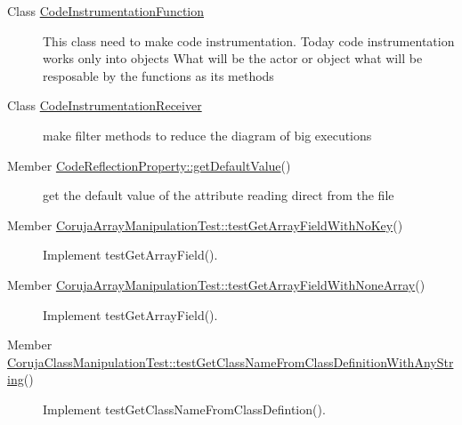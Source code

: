 \label{todo__todo000001}
\hypertarget{todo__todo000001}{}
 \begin{description}
\item[Class \hyperlink{class_code_instrumentation_function}{CodeInstrumentationFunction} ]This class need to make code instrumentation. Today code instrumentation works only into objects  What will be the actor or object what will be resposable by the functions as its methods

\end{description}


\label{todo__todo000002}
\hypertarget{todo__todo000002}{}
 \begin{description}
\item[Class \hyperlink{class_code_instrumentation_receiver}{CodeInstrumentationReceiver} ]make filter methods to reduce the diagram of big executions

\end{description}


\label{todo__todo000003}
\hypertarget{todo__todo000003}{}
 \begin{description}
\item[Member \hyperlink{class_code_reflection_property_f9b9401c63918169457fe8516324950f}{CodeReflectionProperty::getDefaultValue}() ]get the default value of the attribute reading direct from the file \end{description}


\label{todo__todo000004}
\hypertarget{todo__todo000004}{}
 \begin{description}
\item[Member \hyperlink{class_coruja_array_manipulation_test_8399ad4b91876142e2d69ba6077c04eb}{CorujaArrayManipulationTest::testGetArrayFieldWithNoKey}() ]Implement testGetArrayField(). \end{description}


\label{todo__todo000005}
\hypertarget{todo__todo000005}{}
 \begin{description}
\item[Member \hyperlink{class_coruja_array_manipulation_test_48ada181c4be1fc27b5b5542599ac884}{CorujaArrayManipulationTest::testGetArrayFieldWithNoneArray}() ]Implement testGetArrayField(). \end{description}


\label{todo__todo000007}
\hypertarget{todo__todo000007}{}
 \begin{description}
\item[Member \hyperlink{class_coruja_class_manipulation_test_796ba61d6460c6e55138f1a683f17899}{CorujaClassManipulationTest::testGetClassNameFromClassDefinitionWithAnyString}() ]Implement testGetClassNameFromClassDefintion(). \end{description}


